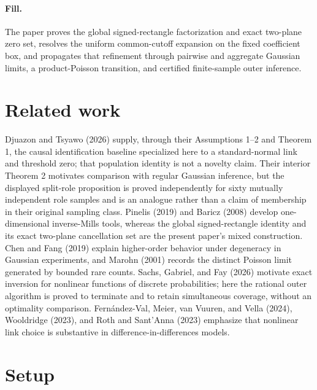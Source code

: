 \documentclass{article}
\begin{document}
\paragraph{Fill.} The paper proves the global signed-rectangle factorization and exact two-plane zero set, resolves the uniform common-cutoff expansion on the fixed coefficient box, and propagates that refinement through pairwise and aggregate Gaussian limits, a product-Poisson transition, and certified finite-sample outer inference.

\section{Related work}

Djuazon and Tsyawo (2026) supply, through their Assumptions 1--2 and Theorem 1, the causal identification baseline specialized here to a standard-normal link and threshold zero; that population identity is not a novelty claim. Their interior Theorem 2 motivates comparison with regular Gaussian inference, but the displayed split-role proposition is proved independently for sixty mutually independent role samples and is an analogue rather than a claim of membership in their original sampling class. Pinelis (2019) and Baricz (2008) develop one-dimensional inverse-Mills tools, whereas the global signed-rectangle identity and its exact two-plane cancellation set are the present paper's mixed construction. Chen and Fang (2019) explain higher-order behavior under degeneracy in Gaussian experiments, and Marohn (2001) records the distinct Poisson limit generated by bounded rare counts. Sachs, Gabriel, and Fay (2026) motivate exact inversion for nonlinear functions of discrete probabilities; here the rational outer algorithm is proved to terminate and to retain simultaneous coverage, without an optimality comparison. Fernández-Val, Meier, van Vuuren, and Vella (2024), Wooldridge (2023), and Roth and Sant'Anna (2023) emphasize that nonlinear link choice is substantive in difference-in-differences models.

\section{Setup}
\end{document}

